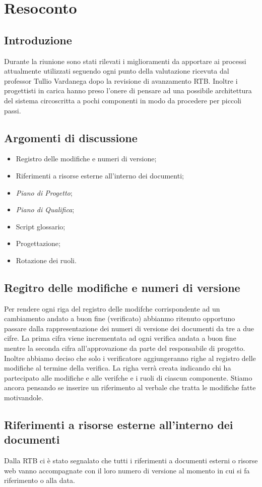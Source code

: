 \section{Resoconto}
\subsection{Introduzione}
Durante la riunione sono stati rilevati i miglioramenti da apportare ai processi attualmente 
utilizzati seguendo ogni punto della valutazione ricevuta dal professor Tullio Vardanega dopo la revisione
di avanzamento RTB.
Inoltre i progettisti in carica hanno preso l'onere di pensare ad una possibile architettura del sistema 
circoscritta a pochi componenti in modo da procedere per piccoli passi.
\subsection{Argomenti di discussione}
\begin{itemize}
    \item Registro delle modifiche e numeri di versione;
    \item Riferimenti a risorse esterne all'interno dei documenti;
    \item \textit{Piano di Progetto};
    \item \textit{Piano di Qualifica};
    \item Script glossario;
    \item Progettazione;
    \item Rotazione dei ruoli.
\end{itemize}
\subsection{Regitro delle modifiche e numeri di versione}
Per rendere ogni riga del registro delle modifche corrispondente ad un cambiamento andato a buon fine 
(verificato) abbianmo ritenuto opportuno passare dalla rappresentazione dei numeri di versione dei documenti 
da tre a due cifre.
La prima cifra viene incrementata ad ogni verifica andata a buon fine mentre la seconda cifra all'approvazione
da parte del responsabile di progetto.
Inoltre abbiamo deciso che solo i verificatore aggiungeranno righe al registro delle modifiche al termine della verifica.
La righa verrà creata indicando chi ha partecipato alle modifiche e alle verifche e i ruoli di ciascun componente.
Stiamo ancora pensando se inserire un riferimento al verbale che tratta le modifiche fatte motivandole.
\subsection{Riferimenti a risorse esterne all'interno dei documenti}
Dalla RTB ci è stato segnalato che tutti i riferimenti a documenti esterni o risorse web vanno accompagnate con 
il loro numero di versione al momento in cui si fa riferimento o alla data.
